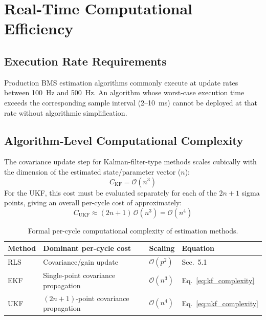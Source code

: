 \section{Real-Time Computational Efficiency}
\label{sec:realtime_efficiency}

\subsection{Execution Rate Requirements}
\label{ssec:realtime_requirements}
Production BMS estimation algorithms commonly execute at update rates between 100~Hz and 500~Hz. An algorithm whose worst-case execution time exceeds the corresponding sample interval (2--10~ms) cannot be deployed at that rate without algorithmic simplification.

\subsection{Algorithm-Level Computational Complexity}
\label{ssec:algorithm_complexity}

The covariance update step for Kalman-filter-type methods scales cubically with the dimension of the estimated state/parameter vector ($n$):
\begin{equation}
	C_{\text{KF}} = \mathcal{O}(n^3)
	\label{eq:kf_complexity}
\end{equation}
For the UKF, this cost must be evaluated separately for each of the $2n+1$ sigma points, giving an overall per-cycle cost of approximately:
\begin{equation}
	C_{\text{UKF}} \approx (2n+1)\, \mathcal{O}(n^3) = \mathcal{O}(n^4)
	\label{eq:ukf_complexity}
\end{equation}

\begin{table}[htbp]
	\centering
	\caption{Formal per-cycle computational complexity of estimation methods.}
	\label{tab:formal_complexity}
	\renewcommand{\arraystretch}{1.3}
	\begin{tabularx}{\textwidth}{@{}l X l l@{}}
		\toprule
		\textbf{Method} & \textbf{Dominant per-cycle cost} & \textbf{Scaling} & \textbf{Equation} \\
		\midrule
		RLS & Covariance/gain update & $\mathcal{O}(p^2)$ & Sec.~5.1 \\
		EKF & Single-point covariance propagation & $\mathcal{O}(n^3)$ & Eq.~\eqref{eq:kf_complexity} \\
		UKF & $(2n{+}1)$-point covariance propagation & $\mathcal{O}(n^4)$ & Eq.~\eqref{eq:ukf_complexity} \\
		\bottomrule
	\end{tabularx}
\end{table}

